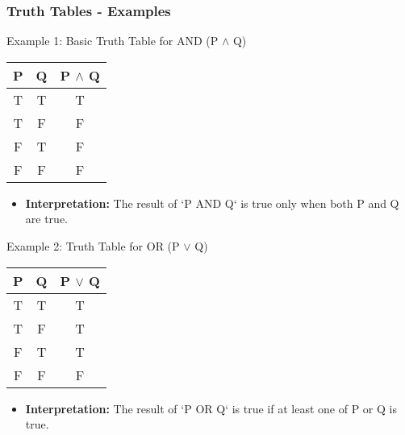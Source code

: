 \documentclass[aspectratio=169]{beamer}
\begin{document}
\begin{frame}[fragile]
    \frametitle{Truth Tables - Examples}
    \begin{block}{Example 1: Basic Truth Table for AND (P $\land$ Q)}
        \begin{tabular}{|c|c|c|}
            \hline
            P & Q & P $\land$ Q \\
            \hline
            T & T & T \\
            T & F & F \\
            F & T & F \\
            F & F & F \\
            \hline
        \end{tabular}
        \begin{itemize}
            \item \textbf{Interpretation:} The result of `P AND Q` is true only when both P and Q are true.
        \end{itemize}
    \end{block}
    
    \begin{block}{Example 2: Truth Table for OR (P $\lor$ Q)}
        \begin{tabular}{|c|c|c|}
            \hline
            P & Q & P $\lor$ Q \\
            \hline
            T & T & T \\
            T & F & T \\
            F & T & T \\
            F & F & F \\
            \hline
        \end{tabular}
        \begin{itemize}
            \item \textbf{Interpretation:} The result of `P OR Q` is true if at least one of P or Q is true.
        \end{itemize}
    \end{block}
\end{frame}
\end{document}
